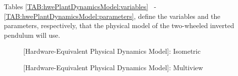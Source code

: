 \documentclass[crop=false,float=true,class=scrreprt]{standalone}
\begin{document}
Tables
\ref{TAB:hwePlantDynamicsModel:variables}~%
-~%
\ref{TAB:hwePlantDynamicsModel:parameters},
define the variables and the parameters, respectively,
that the physical model of the two-wheeled inverted pendulum will use.




\clearpage




\vspace*{\fill}


\begin{figure}[H]%
\centering%
%
\caption[{[Hardware-Equivalent Physical Dynamics Model]: Isometric}]%
        {{[Hardware-Equivalent Physical Dynamics Model]: Isometric%
          \cite{REF:online:2009-yamamoto}%
          \label{FIG:hwePlantDynamicsModel:isometric}%
        }}%
\end{figure}


\vspace*{\fill}


\begin{figure}[H]%
\centering%
%
\caption[{[Hardware-Equivalent Physical Dynamics Model]: Multiview}]%
        {{[Hardware-Equivalent Physical Dynamics Model]: Multiview%
          \cite{REF:online:2009-yamamoto}%
          \label{FIG:hwePlantDynamicsModel:multiview}%
        }}%
\end{figure}


\vspace*{\fill}




\clearpage




\vspace*{\fill}
\end{document}
